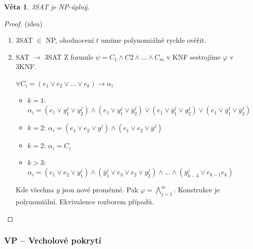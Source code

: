 \documentclass[11pt]{report} %
\newtheorem{theorem}{Věta}[section]
\numberwithin{equation}{section}
\begin{document}
\begin{theorem}
	3SAT je NP-úplný.
\end{theorem}
\begin{proof}(idea)
	\begin{enumerate}

	
	
	\item 3SAT $\in$ NP, ohodnocení $t$ umíme polynomiálně rychle ověřit.
	
	\item SAT $\rightarrow$ 3SAT
	Z formule $\psi = C_1 \wedge C2 \wedge \dots \wedge C_m$ v KNF sestrojíme $\varphi$ v 3KNF.
	
	$\forall C_i = (e_1 \vee e_2 \vee \dots \vee e_k) \rightarrow \alpha_i$
	\begin{itemize}
		
		
		\item $k = 1$: \quad $\alpha_i = (e_1 \vee y_1^j \vee y_2^j) \wedge (e_1 \vee y_1^j \vee \overline{y}_2^j) \vee (e_1 \vee \overline{y}_1^j \vee y_2^j) \vee (e_1 \vee \overline{y}_1^j \vee \overline{y}_2^j)$
		
		\item $k = 2$: \quad $\alpha_i = (e_1 \vee e_2 \vee y^j) \wedge (e_1 \vee e_2 \vee \overline{y}^j)$
		
		\item $k = 2$: \quad $\alpha_i = C_i$
		
		\item $k > 3$: \quad $\alpha_i = (e_1 \vee e_2 \vee y_1^j) \wedge (\overline{y}_1^j \vee e_3 \vee e_2 \vee y_2^j) \wedge \dots \wedge (\overline{y}_{k-3}^j \vee e_{k-1} e_k)$
	\end{itemize}
	Kde všechna $y$ jsou nové proměnné. Pak $\varphi = \bigwedge\limits_{j=1}^m$. Konstrukce je polynomiální. Ekvivalence rozborem případů.
	\end{enumerate}
\end{proof}


\subsubsection{VP -- Vrcholové pokrytí}
\begin{minipage}{\textwidth}
	\bigskip
	\centering
	\bigskip
\end{minipage}
\end{document}
